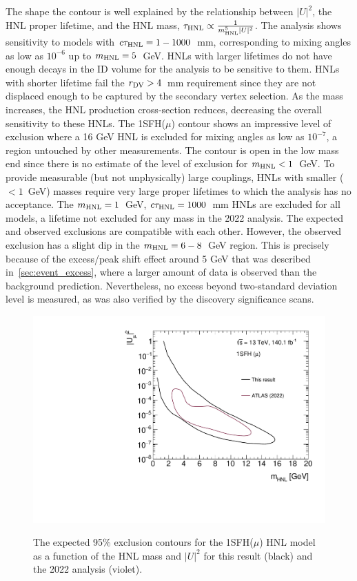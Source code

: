 The shape the contour is well explained by the relationship between $|U|^2$, the HNL proper lifetime, and the HNL mass, $\tau_\mathrm{HNL} \propto \frac{1}{m_{\mathrm{HNL}}^5 |U|^2}$. The analysis shows sensitivity to models with $c\tau_\mathrm{HNL}=1-1000$~mm, corresponding to mixing angles as low as $10^{-6}$ up to $m_{\mathrm{HNL}}=5$~GeV. HNLs with larger lifetimes do not have enough decays in the ID volume for the analysis to be sensitive to them. HNLs with shorter lifetime fail the $r_{\mathrm{DV}}>4$~mm requirement since they are not displaced enough to be captured by the secondary vertex selection. As the mass increases, the HNL production cross-section reduces, decreasing the overall sensitivity to these HNLs. The 1SFH($\mu$) contour shows an impressive level of exclusion where a 16 GeV HNL is excluded for mixing angles as low as $10^{-7}$, a region untouched by other measurements. The contour is open in the low mass end since there is no estimate of the level of exclusion for $m_{\mathrm{HNL}}<1$~GeV. To provide measurable (but not unphysically) large couplings, HNLs with smaller ($<1$~GeV) masses require very large proper lifetimes to which the analysis has no acceptance. 
The $m_{\mathrm{HNL}}=1$~GeV, $c\tau_\mathrm{HNL}=1000$~mm HNLs are excluded for all models, a lifetime not excluded for any mass in the 2022 analysis. The expected and observed exclusions are compatible with each other. However, the observed exclusion has a slight dip in the $m_{\mathrm{HNL}}=6-8$~GeV region. This is precisely because of the excess/peak shift effect around 5 GeV that was described in~\cref{sec:event_excess}, where a larger amount of data is observed than the background prediction. Nevertheless, no excess beyond two-standard deviation level is measured, as was also verified by the discovery significance scans.

\begin{figure}[!htbp]
    \centering
    \includegraphics[width=.72\textwidth]{figures/results/limits_M_LNCpLNV_SF_mu_v_r21.pdf}\\
    \caption{The expected 95\% exclusion contours for the 1SFH($\mu$) HNL model as a function of the HNL mass and $|U|^2$ for this result (black) and the 2022 analysis (violet).}
    \label{fig:mu_only_limit_vs_2022}
\end{figure}


